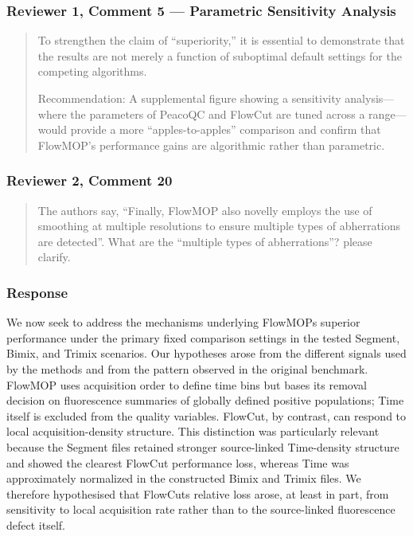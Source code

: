 \documentclass[
  11pt,
  a4paper,
]{article}
\begin{document}
\subsubsection{Reviewer 1, Comment 5 --- Parametric Sensitivity
Analysis}\label{reviewer-1-comment-5--parametric-sensitivity-analysis}

\begin{quote}
To strengthen the claim of ``superiority,'' it is essential to
demonstrate that the results are not merely a function of suboptimal
default settings for the competing algorithms.

Recommendation: A supplemental figure showing a sensitivity
analysis---where the parameters of PeacoQC and FlowCut are tuned across
a range---would provide a more ``apples-to-apples'' comparison and
confirm that FlowMOP's performance gains are algorithmic rather than
parametric.
\end{quote}

\subsubsection{Reviewer 2, Comment 20}\label{reviewer-2-comment-20}

\begin{quote}
The authors say, ``Finally, FlowMOP also novelly employs the use of
smoothing at multiple resolutions to ensure multiple types of
abherrations are detected''. What are the ``multiple types of
abherrations''? please clarify.
\end{quote}

\subsubsection{Response}\label{response-3}

We now seek to address the mechanisms underlying
FlowMOP\textquotesingle s superior performance under the primary fixed
comparison settings in the tested Segment, Bimix, and Trimix scenarios.
Our hypotheses arose from the different signals used by the methods and
from the pattern observed in the original benchmark. FlowMOP uses
acquisition order to define time bins but bases its removal decision on
fluorescence summaries of globally defined positive populations; Time
itself is excluded from the quality variables. FlowCut, by contrast, can
respond to local acquisition-density structure. This distinction was
particularly relevant because the Segment files retained stronger
source-linked Time-density structure and showed the clearest FlowCut
performance loss, whereas Time was approximately normalized in the
constructed Bimix and Trimix files. We therefore hypothesised that
FlowCut\textquotesingle s relative loss arose, at least in part, from
sensitivity to local acquisition rate rather than to the source-linked
fluorescence defect itself.
\end{document}
